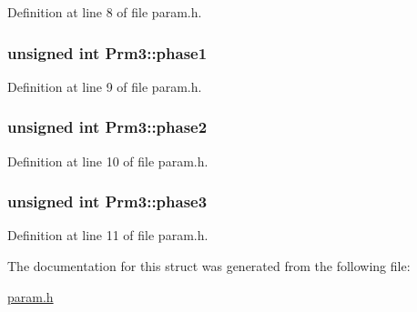 Definition at line 8 of file param.h.\hypertarget{structPrm3_a333c4dbf66ede0a45ef51c0e30583c02}{
\subsubsection[{phase1}]{\setlength{\rightskip}{0pt plus 5cm}unsigned int {\bf Prm3::phase1}}}
\label{structPrm3_a333c4dbf66ede0a45ef51c0e30583c02}


Definition at line 9 of file param.h.\hypertarget{structPrm3_a758633b7ce6f29cf62d39338d58696a2}{
\subsubsection[{phase2}]{\setlength{\rightskip}{0pt plus 5cm}unsigned int {\bf Prm3::phase2}}}
\label{structPrm3_a758633b7ce6f29cf62d39338d58696a2}


Definition at line 10 of file param.h.\hypertarget{structPrm3_aac88bf16a9706b0975457f2c0a7ced63}{
\subsubsection[{phase3}]{\setlength{\rightskip}{0pt plus 5cm}unsigned int {\bf Prm3::phase3}}}
\label{structPrm3_aac88bf16a9706b0975457f2c0a7ced63}


Definition at line 11 of file param.h.

The documentation for this struct was generated from the following file:\begin{DoxyCompactItemize}
\item 
\hyperlink{param_8h}{param.h}\end{DoxyCompactItemize}
